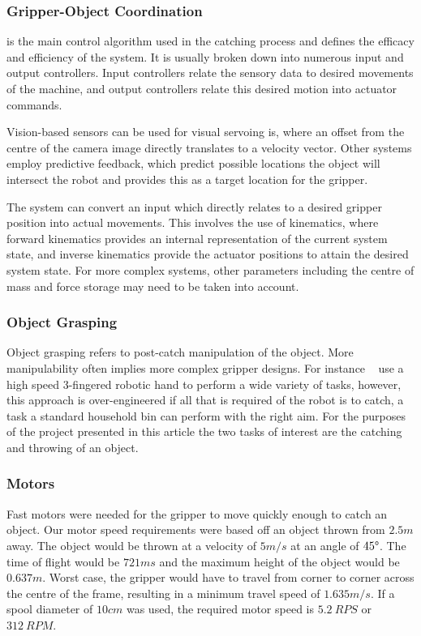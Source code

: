 \documentclass[conference]{IEEEtran}
\begin{document}
\subsubsection{Gripper-Object Coordination}
is the main control algorithm used in the catching process and defines the efficacy and efficiency of the system. It is usually broken down into numerous input and output controllers. Input controllers relate the sensory data to desired movements of the machine, and output controllers relate this desired motion into actuator commands.

Vision-based sensors can be used for visual servoing is, where an offset from the centre of the camera image directly translates to a velocity vector. Other systems employ predictive feedback, which predict possible locations the object will intersect the robot and provides this as a target location for the gripper.

The system can convert an input which directly relates to a desired gripper position into actual movements. This involves the use of kinematics, where forward kinematics provides an internal representation of the current system state, and inverse kinematics provide the actuator positions to attain the desired system state. For more complex systems, other parameters including the centre of mass and force storage may need to be taken into account. 

\subsubsection{Object Grasping}
Object grasping refers to post-catch manipulation of the object. More manipulability often implies more complex gripper designs. For instance ~\cite{1249273} use a high speed 3-fingered robotic hand to perform a wide variety of tasks, however, this approach is over-engineered if all that is required of the robot is to catch, a task a standard household bin can perform with the right aim.
For the purposes of the project presented in this article the two tasks of interest are the catching and throwing of an object.

\subsubsection{Motors}\label{motorSpeedRequired}
Fast motors were needed for the gripper to move quickly enough to catch an object. Our motor speed requirements were based off an object thrown from $2.5m$ away. The object would be thrown at a velocity of $5m/s$ at an angle of $45\degree$. The time of flight would be $721ms$ and the maximum height of the object would be $0.637m$. Worst case, the gripper would have to travel from corner to corner across the centre of the frame, resulting in a minimum travel speed of $1.635m/s$. If a spool diameter of $10cm$ was used, the required motor speed is $5.2\ RPS$ or $312\ RPM$.
\end{document}
